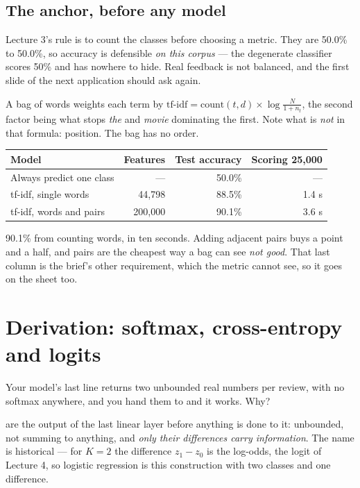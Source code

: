 \documentclass[11pt,a4paper]{article}
\begin{document}
\subsection{The anchor, before any model}

Lecture 3's rule is to count the classes before choosing a metric. They are
50.0\% to 50.0\%, so accuracy is defensible \emph{on this corpus} --- the
degenerate classifier scores 50\% and has nowhere to hide. Real feedback is not
balanced, and the first slide of the next application should ask again.

A bag of words weights each term by
$\text{tf-idf} = \text{count}(t,d)\times\log\frac{N}{1+n_t}$, the second factor
being what stops \emph{the} and \emph{movie} dominating the first. Note what is
\emph{not} in that formula: position. The bag has no order.

\begin{center}
\small
\begin{tabular}{lrrr}
\toprule
\textbf{Model} & \textbf{Features} & \textbf{Test accuracy} &
\textbf{Scoring 25{,}000} \\
\midrule
Always predict one class & --- & 50.0\% & --- \\
tf-idf, single words & 44{,}798 & 88.5\% & 1.4 s \\
tf-idf, words and pairs & 200{,}000 & 90.1\% & 3.6 s \\
\bottomrule
\end{tabular}
\end{center}

90.1\% from counting words, in ten seconds. Adding adjacent pairs buys a point
and a half, and pairs are the cheapest way a bag can see \emph{not good}. That
last column is the brief's other requirement, which the metric cannot see, so
it goes on the sheet too.

\section{Derivation: softmax, cross-entropy and logits}

Your model's last line returns two unbounded real numbers per review, with no
softmax anywhere, and you hand them to  and it works.
Why?

 are the output of the last linear layer before anything is done
to it: unbounded, not summing to anything, and \emph{only their differences
carry information}. The name is historical --- for $K = 2$ the difference
$z_1 - z_0$ is the log-odds, the logit of Lecture 4, so logistic regression is
this construction with two classes and one difference.
\end{document}
